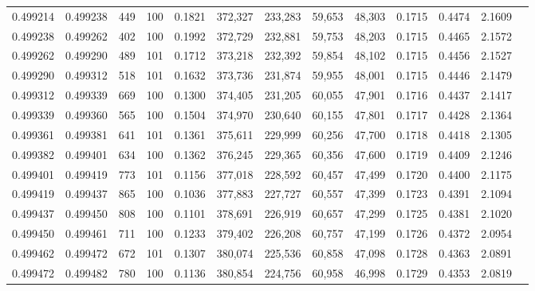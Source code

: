 \begin{tabular}{rrrrrrrrrrrrr}
0.499214 & 0.499238 &   449 & 100 &                                     0.1821 & 372,327 & 233,283 &  59,653 &  48,303 & 0.1715 & 0.4474 & 2.1609 \\
0.499238 & 0.499262 &   402 & 100 &                                     0.1992 & 372,729 & 232,881 &  59,753 &  48,203 & 0.1715 & 0.4465 & 2.1572 \\
0.499262 & 0.499290 &   489 & 101 &                                     0.1712 & 373,218 & 232,392 &  59,854 &  48,102 & 0.1715 & 0.4456 & 2.1527 \\
0.499290 & 0.499312 &   518 & 101 &                                     0.1632 & 373,736 & 231,874 &  59,955 &  48,001 & 0.1715 & 0.4446 & 2.1479 \\
0.499312 & 0.499339 &   669 & 100 &                                     0.1300 & 374,405 & 231,205 &  60,055 &  47,901 & 0.1716 & 0.4437 & 2.1417 \\
0.499339 & 0.499360 &   565 & 100 &                                     0.1504 & 374,970 & 230,640 &  60,155 &  47,801 & 0.1717 & 0.4428 & 2.1364 \\
0.499361 & 0.499381 &   641 & 101 &                                     0.1361 & 375,611 & 229,999 &  60,256 &  47,700 & 0.1718 & 0.4418 & 2.1305 \\
0.499382 & 0.499401 &   634 & 100 &                                     0.1362 & 376,245 & 229,365 &  60,356 &  47,600 & 0.1719 & 0.4409 & 2.1246 \\
0.499401 & 0.499419 &   773 & 101 &                                     0.1156 & 377,018 & 228,592 &  60,457 &  47,499 & 0.1720 & 0.4400 & 2.1175 \\
0.499419 & 0.499437 &   865 & 100 &                                     0.1036 & 377,883 & 227,727 &  60,557 &  47,399 & 0.1723 & 0.4391 & 2.1094 \\
0.499437 & 0.499450 &   808 & 100 &                                     0.1101 & 378,691 & 226,919 &  60,657 &  47,299 & 0.1725 & 0.4381 & 2.1020 \\
0.499450 & 0.499461 &   711 & 100 &                                     0.1233 & 379,402 & 226,208 &  60,757 &  47,199 & 0.1726 & 0.4372 & 2.0954 \\
0.499462 & 0.499472 &   672 & 101 &                                     0.1307 & 380,074 & 225,536 &  60,858 &  47,098 & 0.1728 & 0.4363 & 2.0891 \\
0.499472 & 0.499482 &   780 & 100 &                                     0.1136 & 380,854 & 224,756 &  60,958 &  46,998 & 0.1729 & 0.4353 & 2.0819 \\

\end{tabular}
